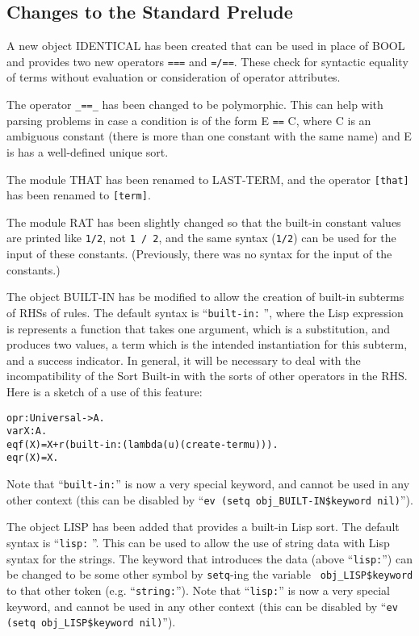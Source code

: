 \subsection{Changes to the Standard Prelude}

A new object IDENTICAL has been created that can be used in place of
BOOL and provides two new operators {\tt ===} and {\tt =/==}.  These
check for syntactic equality of terms without evaluation or
consideration of operator attributes.

The operator {\tt \_==\_} has been changed to be polymorphic.  This
can help with parsing problems in case a condition is of the form E
{\tt ==} C, where C is an ambiguous constant (there is more than one
constant with the same name) and E is has a well-defined unique sort.

The module THAT has been renamed to LAST-TERM, and the operator
{\tt [that]} has been renamed to {\tt [term]}.

The module RAT has been slightly changed so that the built-in constant
values are printed like {\tt 1/2}, not {\tt 1 / 2}, and the same
syntax ({\tt 1/2}) can be used for the input of these constants.
(Previously, there was no syntax for the input of the constants.)

The object BUILT-IN has be modified to allow the creation of built-in
subterms of RHSs of rules.  The default syntax is ``{\tt built-in:}
'', where the Lisp expression is represents a function that
takes one argument, which is a substitution, and produces two values,
a term which is the intended instantiation for this subterm, and a
success indicator.  In general, it will be necessary to deal with the
incompatibility of the Sort Built-in with the sorts of other operators
in the RHS.  Here is a sketch of a use of this feature:

\begin{alltt}
          op r : Universal -> A .
          var X : A .
          eq f(X) = X + r(built-in: (lambda (u) (create-term u))) .
          eq r(X) = X .
\end{alltt}
Note that ``{\tt built-in:}'' is now a very special keyword, and
cannot be used in any other context (this can be disabled by ``{\tt ev
  (setq obj\_BUILT-IN\$keyword nil)}'').

The object LISP has been added that provides a built-in Lisp sort.
The default syntax is ``{\tt lisp:} ''.  This can be used to
allow the use of string data with Lisp syntax for the strings.  The
keyword that introduces the data (above ``{\tt lisp:}'') can be
changed to be some other symbol by {\tt setq}-ing the variable {\tt
  obj\_LISP\$keyword} to that other token (e.g. ``{\tt string:}'').
Note that ``{\tt lisp:}'' is now a very special keyword, and cannot be
used in any other context (this can be disabled by ``{\tt ev (setq
  obj\_LISP\$keyword nil)}'').

